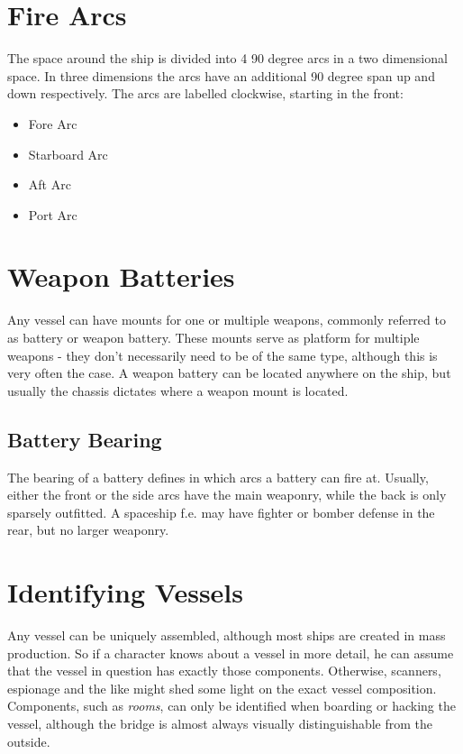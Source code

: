 \section{Fire Arcs}
\label{sec:Vessels-Fire-Arcs}

The space around the ship is divided into 4 90 degree arcs in a two dimensional space. In three dimensions the arcs have an additional 90 degree span up and down respectively. The arcs are labelled clockwise, starting in the front:

\begin{itemize}
  \item Fore Arc
  \item Starboard Arc
  \item Aft Arc
  \item Port Arc
\end{itemize}

\section{Weapon Batteries}
\label{sec:Vessels-Weapon-Batteries}

Any vessel can have mounts for one or multiple weapons, commonly referred to as battery or weapon battery. These mounts serve as platform for multiple weapons - they don't necessarily need to be of the same type, although this is very often the case. A weapon battery can be located anywhere on the ship, but usually the chassis dictates where a weapon mount is located.

\subsection{Battery Bearing}
\label{sub:Vessels-Battery-Bearing}

The bearing of a battery defines in which arcs a battery can fire at. Usually, either the front or the side arcs have the main weaponry, while the back is only sparsely outfitted. A spaceship f.e. may have fighter or bomber defense in the rear, but no larger weaponry.

\section{Identifying Vessels}
\label{sec:Vessels-Identifying Vessels}

Any vessel can be uniquely assembled, although most ships are created in mass production. So if a character knows about a vessel in more detail, he can assume that the vessel in question has exactly those components. Otherwise, scanners, espionage and the like might shed some light on the exact vessel composition. Components, such as \emph{rooms}, can only be identified when boarding or hacking the vessel, although the bridge is almost always visually distinguishable from the outside.


